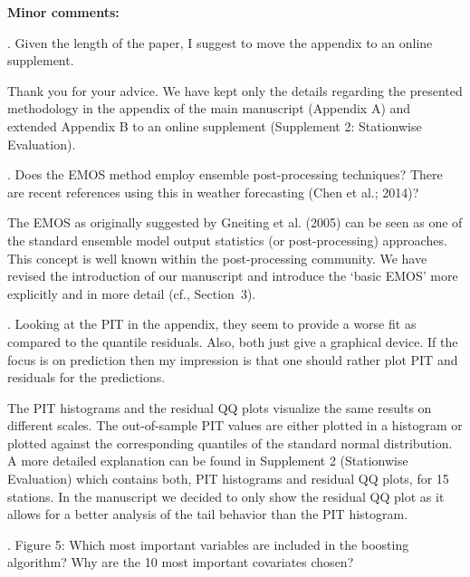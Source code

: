 \documentclass[american,foldmarks=false,noconfig]{uibklttr}
\newenvironment{review}{\fontshape{\itdefault}\fontseries{\bfdefault} \selectfont \smallskip}{\par}
\begin{document}
\bigskip

\textbf{Minor comments:}


\begin{review}
1. Given the length of the paper, I suggest to move the 
appendix to an online supplement.
\end{review}

Thank you for your advice. We have kept only the details regarding
the presented methodology in the appendix of the main manuscript
(Appendix A) and extended Appendix B to an online supplement
(Supplement 2: Stationwise Evaluation).

\begin{review}
2. Does the EMOS method employ ensemble post-processing 
techniques? There are recent references using this in weather 
forecasting (Chen et al.; 2014)?
\end{review}

The EMOS as originally suggested by Gneiting et al. (2005) can be seen
as one of the standard ensemble model output statistics (or post-processing)
approaches. This concept is well known within the post-processing community.
We have revised the introduction of our manuscript and introduce the `basic EMOS'
more explicitly and in more detail (cf., Section~3).


\begin{review}
3. Looking at the PIT in the appendix, they seem to provide a 
worse fit as compared to the quantile residuals. Also, both 
just give a graphical device. If the focus is on prediction 
then my impression is that one should rather plot PIT and 
residuals for the predictions.
\end{review}

The PIT histograms and the residual QQ plots visualize the same
results on different scales. The out-of-sample PIT values are 
either plotted in a histogram or plotted against the corresponding
quantiles of the standard normal distribution. A more detailed 
explanation can be found in Supplement 2 (Stationwise Evaluation) 
which contains both, PIT histograms and residual QQ plots, 
for 15 stations. In the manuscript we decided to only show the 
residual QQ plot as it allows for a better analysis of the tail 
behavior than the PIT histogram.


\begin{review}
4. Figure 5: Which most important variables are included in the 
boosting algorithm? Why are the 10 most important covariates chosen?
\end{review}
\end{document}
